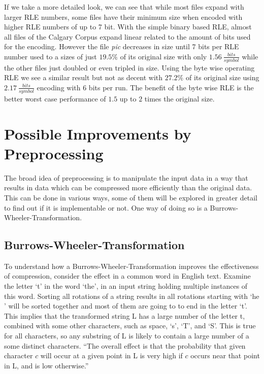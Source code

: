 \par{
If we take a more detailed look, we can see that while most files expand with larger RLE numbers, some files have their minimum size when encoded with higher RLE numbers of up to 7 bit. With the simple binary based RLE, almost all files of the Calgary Corpus expand linear related to the amount of bits used for the encoding. However the file \textit{pic} decreases in size until 7 bits per RLE number used to a sizes of just $19.5 \%$ of its original size with only  $1.56 \: \frac{bits}{symbol}$ while the other files just doubled or even tripled in size. Using the byte wise operating RLE we see a similar result but not as decent with $27.2\%$ of its original size using $2.17 \: \frac{bits}{symbol}$ encoding with 6 bits per run. The benefit of the byte wise RLE is the better worst case performance of $1.5$ up to $2$ times the original size.
}


\section{Possible Improvements by Preprocessing}
\label{ch:Analysis:sec:Improvements by Preprocessing}

The broad idea of preprocessing is to manipulate the input data in a way that results in data which can be compressed more efficiently than the original data. This can be done in various ways, some of them will be explored in greater detail to find out if it is implementable or not. One way of doing so is a Burrows-Wheeler-Transformation.

\subsection{Burrows-Wheeler-Transformation}
\label{ch:Analysis:sec:Improvements by Preprocessing:subSec:bwt}
\par{
To understand how a Burrows-Wheeler-Transformation improves the effectiveness of compression, consider the effect in a common word in English text. Examine the letter ‘t’ in the word ‘the’, in an input string holding multiple instances of this word.
Sorting all rotations of a string results in all rotations starting with ‘he ’ will be sorted together and most of them are going to to end in the letter ‘t’. This implies that the transformed string L has a large number of the letter t, combined with some other characters, such as space, ‘s’, ‘T’, and ‘S’. This is true for all characters, so any substring of L is likely to contain a large number of a some distinct characters. \enquote{The overall effect is that the probability that given character $c$ will occur at a given
point in L is very high if $c$ occurs near that point in L, and is low otherwise.} \cite{Burrows94}
}

